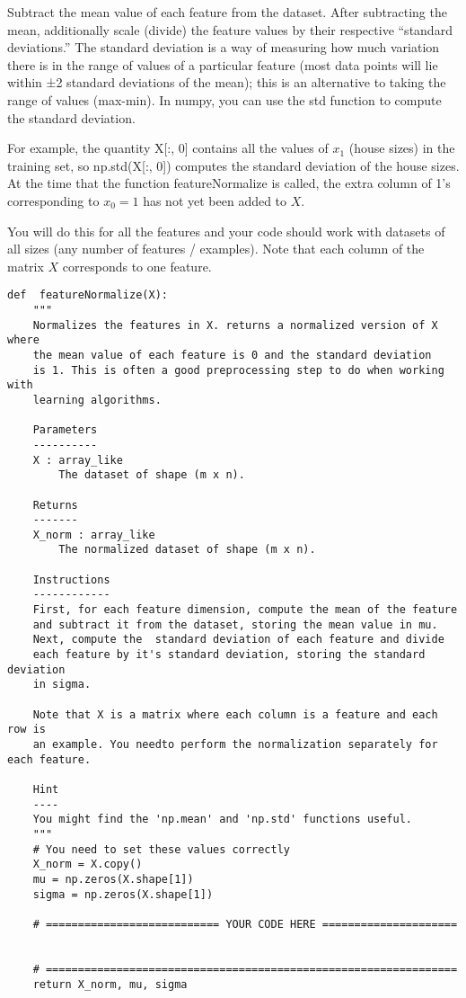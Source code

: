\documentclass[11pt]{article}
\begin{document}
Subtract the mean value of each feature from the dataset.
After subtracting the mean, additionally scale (divide) the feature values by their respective “standard deviations.”
The standard deviation is a way of measuring how much variation there is in the range of values of a particular feature (most data points will lie within ±2 standard deviations of the mean); this is an alternative to taking the range of values (max-min). In numpy, you can use the std function to compute the standard deviation.

For example, the quantity X[:, 0] contains all the values of \(x_1\) (house sizes) in the training set, so np.std(X[:, 0]) computes the standard deviation of the house sizes. At the time that the function featureNormalize is called, the extra column of 1’s corresponding to \(x_0 = 1\) has not yet been added to \(X\).

You will do this for all the features and your code should work with datasets of all sizes (any number of features / examples). Note that each column of the matrix \(X\) corresponds to one feature.
\begin{verbatim}
def  featureNormalize(X):
    """
    Normalizes the features in X. returns a normalized version of X where
    the mean value of each feature is 0 and the standard deviation
    is 1. This is often a good preprocessing step to do when working with
    learning algorithms.

    Parameters
    ----------
    X : array_like
        The dataset of shape (m x n).

    Returns
    -------
    X_norm : array_like
        The normalized dataset of shape (m x n).

    Instructions
    ------------
    First, for each feature dimension, compute the mean of the feature
    and subtract it from the dataset, storing the mean value in mu.
    Next, compute the  standard deviation of each feature and divide
    each feature by it's standard deviation, storing the standard deviation
    in sigma.

    Note that X is a matrix where each column is a feature and each row is
    an example. You needto perform the normalization separately for each feature.

    Hint
    ----
    You might find the 'np.mean' and 'np.std' functions useful.
    """
    # You need to set these values correctly
    X_norm = X.copy()
    mu = np.zeros(X.shape[1])
    sigma = np.zeros(X.shape[1])

    # =========================== YOUR CODE HERE =====================


    # ================================================================
    return X_norm, mu, sigma

\end{verbatim}
\end{document}
